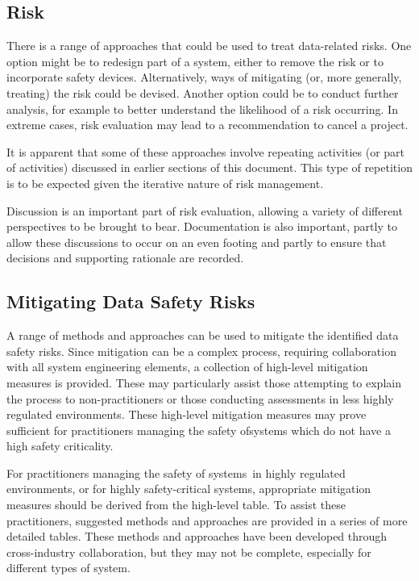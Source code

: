\subsection{Risk }
There is a range of approaches that could be used to \gls{treat} data-related risks. One option might be to redesign part of a system, either to remove the risk or to incorporate safety devices. Alternatively, ways of mitigating (or, more generally, treating) the risk could be devised. Another option could be to conduct further analysis, for example to better understand the likelihood of a risk occurring. In extreme cases, risk evaluation may lead to a recommendation to cancel a project.

It is apparent that some of these approaches involve repeating activities (or part of activities) discussed in earlier sections of this document. This type of repetition is to be expected given the iterative nature of risk management.

Discussion is an important part of risk evaluation, allowing a variety of different perspectives to be brought to bear. Documentation is also important, partly to allow these discussions to occur on an even footing and partly to ensure that decisions and supporting rationale are recorded.

\subsection{Mitigating Data Safety Risks}
A range of methods and approaches can be used to mitigate the identified data safety risks. Since \gls{mitigation} can be a complex process, requiring collaboration with all system engineering elements, a collection of high-level \gls{mitigation} measures is provided. These may particularly assist those attempting to explain the process to non-practitioners or those conducting assessments in less highly regulated environments. These high-level \gls{mitigation} measures may prove sufficient for practitioners \cbstart managing the safety of\cbend systems which do not have a high safety criticality.

For practitioners \cbstart managing the safety of systems\cbend\ in highly regulated environments, or for highly safety-critical systems, appropriate \gls{mitigation} measures should be derived from the high-level table. To assist these practitioners, suggested methods and approaches are provided in a series of more detailed tables. These methods and approaches have been developed through cross-industry collaboration, but they may not be complete, especially for different types of system. 

